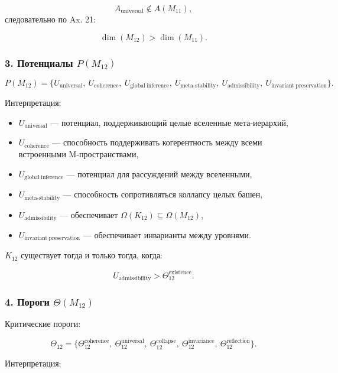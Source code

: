 \[
A_{\mathrm{universal}}\notin A(M_{11}),
\]
следовательно по Ax. 21:

\[
\dim(M_{12}) > \dim(M_{11}).
\]

\subsubsection*{3. Потенциалы $P(M_{12})$}

\[
P(M_{12}) =
\{
U_{\mathrm{universal}},\
U_{\mathrm{coherence}},\
U_{\mathrm{global\ inference}},\
U_{\mathrm{meta\mbox{-}stability}},\
U_{\mathrm{admissibility}},\
U_{\mathrm{invariant\ preservation}}
\}.
\]

Интерпретация:

\begin{itemize}
    \item $U_{\mathrm{universal}}$ — потенциал, поддерживающий целые вселенные мета-иерархий,
    \item $U_{\mathrm{coherence}}$ — способность поддерживать когерентность между всеми встроенными M-пространствами,
    \item $U_{\mathrm{global\ inference}}$ — потенциал для рассуждений между вселенными,
    \item $U_{\mathrm{meta\mbox{-}stability}}$ — способность сопротивляться коллапсу целых башен,
    \item $U_{\mathrm{admissibility}}$ — обеспечивает $\Omega(K_{12})\subseteq\Omega(M_{12})$,
    \item $U_{\mathrm{invariant\ preservation}}$ — обеспечивает инварианты между уровнями.
\end{itemize}

$K_{12}$ существует тогда и только тогда, когда:

\[
U_{\mathrm{admissibility}} > \Theta_{12}^{\mathrm{existence}}.
\]

\subsubsection*{4. Пороги $\Theta(M_{12})$}

Критические пороги:

\[
\Theta_{12}=
\{
\Theta_{12}^{\mathrm{coherence}},\
\Theta_{12}^{\mathrm{universal}},\
\Theta_{12}^{\mathrm{collapse}},\
\Theta_{12}^{\mathrm{invariance}},\
\Theta_{12}^{\mathrm{reflection}}
\}.
\]

Интерпретация:

